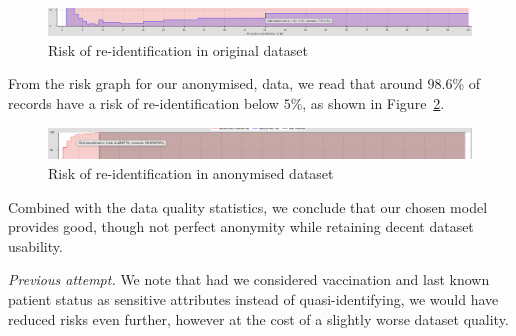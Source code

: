 \documentclass[parskip=half]{scrartcl}
\newcommand\figref{Figure~\ref}
\begin{document}
\begin{figure}[ht]
    \begin{center}
        \includegraphics[width=\textwidth]{reid_risk_original}
        \caption{Risk of re-identification in original dataset}
        \label{fig:reid-risk-og}
    \end{center}
\end{figure}

From the risk graph for our anonymised, data, we read that around $98.6$\% of
records have a risk of re-identification below $5$\%, as shown in
\figref{fig:reid-risk-anon}.

\begin{figure}[ht]
    \begin{center}
        \includegraphics[width=\textwidth]{reid_risk_anon}
        \caption{Risk of re-identification in anonymised dataset}
        \label{fig:reid-risk-anon}
    \end{center}
\end{figure}

Combined with the data quality statistics, we conclude that our chosen model
provides good, though not perfect anonymity while retaining decent dataset
usability.

\textit{Previous attempt.} We note that had we considered vaccination and
last known patient status as sensitive attributes instead of quasi-identifying,
we would have reduced risks even further, however at the cost of a slightly
worse dataset quality.
\end{document}
